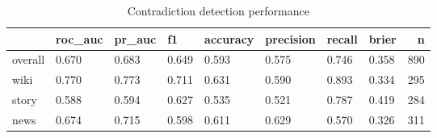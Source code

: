 \begin{table}
\caption{Contradiction detection performance}
\label{tab:results}
\begin{tabular}{llllllllr}
\toprule
 & roc_auc & pr_auc & f1 & accuracy & precision & recall & brier & n \\
\midrule
overall & 0.670 & 0.683 & 0.649 & 0.593 & 0.575 & 0.746 & 0.358 & 890 \\
wiki & 0.770 & 0.773 & 0.711 & 0.631 & 0.590 & 0.893 & 0.334 & 295 \\
story & 0.588 & 0.594 & 0.627 & 0.535 & 0.521 & 0.787 & 0.419 & 284 \\
news & 0.674 & 0.715 & 0.598 & 0.611 & 0.629 & 0.570 & 0.326 & 311 \\
\bottomrule
\end{tabular}
\end{table}
